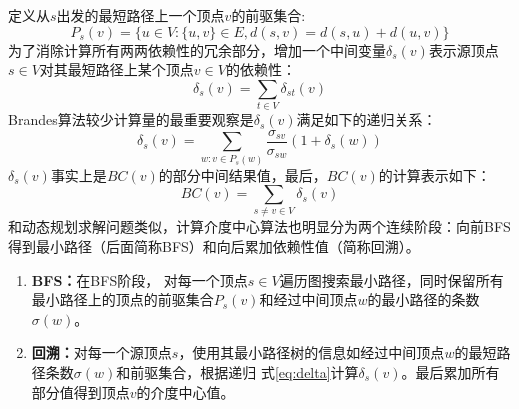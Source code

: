 \begin{flushleft}
定义从$s$出发的最短路径上一个顶点$v$的前驱集合:
\begin{equation}
P_{s}(v)=\{u\in V: \{u,v\}\in E, d(s,v)=d(s,u)+d(u,v)\}
\end{equation}
为了消除计算所有两两依赖性的冗余部分，增加一个中间变量$\delta_{s}(v)$表示源顶点$s\in V$对其最短路径上某个顶点$v\in
V$的依赖性：
\begin{equation}
\delta_{s}(v)=\sum_{t\in V}\delta_{st}(v)
\end{equation}
Brandes算法较少计算量的最重要观察是$\delta_{s}(v)$满足如下的递归关系：
\begin{equation}\label{eq:delta}
\delta_{s}(v)=\sum_{w:v\in P_{s}(w)}\frac{\sigma_{sv}}{\sigma_{sw}}(1+\delta_{s}(w))
\end{equation}
$\delta_{s}(v)$事实上是$BC(v)$的部分中间结果值，最后，$BC(v)$的计算表示如下：
\begin{equation}\label{eq:BC}
BC(v)=\sum_{s\neq v\in V}\delta_{s}(v)
\end{equation}
和动态规划求解问题类似，计算介度中心算法也明显分为两个连续阶段：向前BFS得到最小路径（后面简称BFS）和向后累加依赖性值（简称回溯）。
\begin{enumerate}
	\item {\bf BFS：}在BFS阶段， 对每一个顶点$s\in
	V$遍历图搜索最小路径，同时保留所有最小路径上的顶点的前驱集合$P_{s}(v)$和经过中间顶点$w$的最小路径的条数$\sigma(w)$。
	\item {\bf 回溯：}对每一个源顶点$s$，使用其最小路径树的信息如经过中间顶点$w$的最短路径条数$\sigma(w)$和前驱集合，根据递归
	式\ref{eq:delta}计算$\delta_{s}(v)$。最后累加所有部分值得到顶点$v$的介度中心值。
\end{enumerate}


\end{flushleft}
